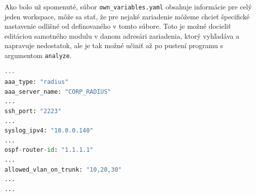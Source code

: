 Ako bolo už spomenuté, súbor \texttt{own\_variables.yaml} obsahuje informácie pre celý jeden workspace, môže sa stať, že pre nejaké zariadenie môžeme chcieť špecifické nastavenie odlišné od definovaného v tomto súbore. Toto je možné docieliť editáciou samotného modulu v danom adresári zariadenia, ktorý vyhľadáva a napravuje nedostatok, ale je tak možné učiniť až po pustení programu s argumentom \texttt{analyze}.
\begin{lstlisting}[frame=single,numbers=right,caption={Ukážka skráteného príkladu vyplneného konfiguračného súboru \texttt{own\_variables.yaml} definujúceho premenné potrebné na generovanie nápravy},label=yaml:variables,basicstyle=\ttfamily\small, keywordstyle=\color{black},language=python,breaklines=true]
---
aaa_type: "radius"
aaa_server_name: "CORP_RADIUS"
...
ssh_port: "2223"
...
syslog_ipv4: "10.0.0.140"
...
ospf-router-id: "1.1.1.1"
...
allowed_vlan_on_trunk: "10,20,30"
...
...
\end{lstlisting}

